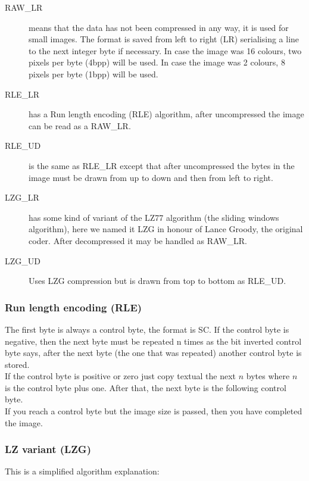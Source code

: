 \documentclass{article}
\begin{document}
\begin{description}

\item[RAW\_LR]{means that the data has not been compressed in any way, it is used
        for small images.
        The format is saved from left to right (LR) serialising a line to
        the next integer byte if necessary. In case the image was 16
        colours, two pixels per byte (4bpp) will be used. In case the image
        was 2 colours, 8 pixels per byte (1bpp) will be used.
}
\item[RLE\_LR]{has a  Run length encoding  (RLE) algorithm, after uncompressed the
        image can be read as a RAW\_LR.}

\item[RLE\_UD]{is the same as RLE\_LR except that after uncompressed the bytes in
        the image must be drawn from up to down and then from left to right.}

\item[LZG\_LR]{ has some kind of variant of the LZ77 algorithm (the sliding windows
        algorithm), here we named it  LZG in honour of Lance Groody, the
        original coder.
        After decompressed it may be handled as RAW\_LR.}
\item[LZG\_UD]{Uses LZG compression but is drawn from top to bottom as RLE\_UD.}

\end{description}

\subsubsection{Run length encoding (RLE)} %
 The first byte is always a control byte, the format is SC. If the control
 byte is negative, then the next byte must be repeated n times as the bit
 inverted control byte says, after the next byte (the one that was
 repeated) another control byte is stored.\\
 If the control byte is positive or zero just copy textual the next $n$ bytes
 where $n$ is the control byte plus one. After that, the next byte is the
 following control byte.\\
 If you reach a control byte but the image size is passed, then you have
 completed the image.

\subsubsection{LZ variant (LZG)} %
 This is a simplified algorithm explanation:
\end{document}
